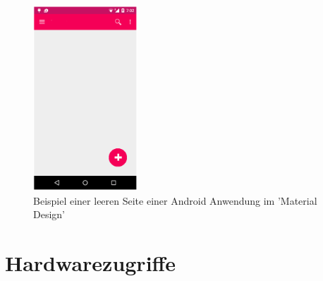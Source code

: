 \begin{figure}[h]
	\centering
	\includegraphics[width=0.35\textwidth]{Bilder/Material_Design_Blank_Page.PNG}
	\caption{Beispiel einer leeren Seite einer Android Anwendung im 'Material Design'}
	\label{fig:Material_Design}
\end{figure}

\section{Hardwarezugriffe}

